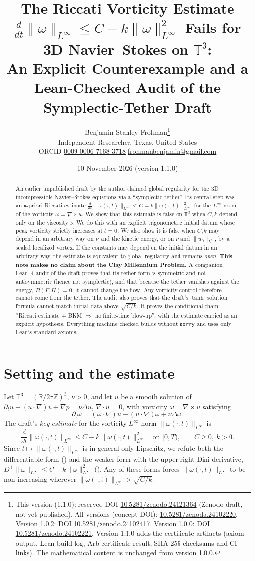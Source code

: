 \documentclass[11pt]{article}
\title{The Riccati Vorticity Estimate $\frac{d}{dt}\|\omega\|_{L^\infty}\le C-k\|\omega\|_{L^\infty}^2$ Fails for 3D Navier--Stokes on $\mathbb{T}^3$:\\
An Explicit Counterexample and a Lean-Checked Audit of the Symplectic-Tether Draft}
\author{Benjamin Stanley Frohman\thanks{This version (1.1.0): reserved DOI \href{https://doi.org/10.5281/zenodo.24121364}{10.5281/zenodo.24121364} (Zenodo draft, not yet published). All versions (concept DOI): \href{https://doi.org/10.5281/zenodo.24102220}{10.5281/zenodo.24102220}. Version 1.0.2: DOI \href{https://doi.org/10.5281/zenodo.24102417}{10.5281/zenodo.24102417}. Version 1.0.0: DOI \href{https://doi.org/10.5281/zenodo.24102221}{10.5281/zenodo.24102221}. Version 1.1.0 adds the certificate artifacts (axiom output, Lean build log, Arb certificate result, SHA-256 checksums and CI links). The mathematical content is unchanged from version 1.0.0.}\\
\small Independent Researcher, Texas, United States\\
\small ORCID \href{https://orcid.org/0009-0006-7068-3718}{0009-0006-7068-3718} \quad
\small \href{mailto:frohmanbenjamin@gmail.com}{frohmanbenjamin@gmail.com}}
\date{10 November 2026 \quad (version 1.1.0)}
\newcommand{\T}{\mathbb{T}^3}
\newcommand{\R}{\mathbb{R}}
\theoremstyle{remark}
\newcommand{\lean}[1]{\path{#1}}
\begin{document}
\maketitle

\begin{abstract}
An earlier unpublished draft by the author claimed global regularity for the 3D incompressible
Navier--Stokes equations via a ``symplectic tether''. Its central step was an a-priori Riccati estimate
$\frac{d}{dt}\|\omega(\cdot,t)\|_{L^\infty}\le C-k\|\omega(\cdot,t)\|_{L^\infty}^2$ for the $L^\infty$ norm of the vorticity $\omega=\nabla\times u$. We show that this estimate is
false on $\T$ when $C,k$ depend only on the viscosity $\nu$. We do this with an explicit trigonometric initial
datum whose peak vorticity strictly increases at $t=0$. We also show it is false when $C,k$ may depend in an
arbitrary way on $\nu$ and the kinetic energy, or on $\nu$ and $\|u_0\|_{L^3}$, by a scaled localized vortex. If the constants may
depend on the initial datum in an arbitrary way, the estimate is equivalent to global regularity and remains
\emph{open}. \textbf{This note makes no claim about the Clay Millennium Problem.} A companion Lean~4 audit of the draft proves that its
tether form is symmetric and not antisymmetric (hence not symplectic), and that because the tether vanishes against the
energy, $B(F,H)=0$, it cannot change the flow. Any vorticity control therefore cannot come from the tether. The audit
also proves that the draft's $\tanh$ solution formula cannot match initial data above $\sqrt{C/k}$. It proves
the conditional chain ``Riccati estimate $+$ BKM $\Rightarrow$ no finite-time blow-up'', with the estimate
carried as an explicit hypothesis. Everything machine-checked builds without \texttt{sorry} and uses only
Lean's standard axioms.
\end{abstract}

\section{Setting and the estimate}
Let $\T=(\R/2\pi\mathbb{Z})^3$, $\nu>0$, and let $u$ be a smooth solution of
$\partial_t u+(u\cdot\nabla)u+\nabla p=\nu\Delta u$, $\nabla\cdot u=0$, with vorticity $\omega=\nabla\times u$ satisfying
\begin{equation}\label{eq:vort}
\partial_t\omega=(\omega\cdot\nabla)u-(u\cdot\nabla)\omega+\nu\Delta\omega .
\end{equation}
The draft's \emph{key estimate} for the vorticity $L^\infty$ norm $\|\omega(\cdot,t)\|_{L^\infty}$ is
\begin{equation}\label{eq:key}
\frac{d}{dt}\|\omega(\cdot,t)\|_{L^\infty}\le C-k\,\|\omega(\cdot,t)\|_{L^\infty}^2\quad\text{on }[0,T),\qquad C\ge0,\ k>0 .
\end{equation}
Since $t\mapsto\|\omega(\cdot,t)\|_{L^\infty}$ is in general only Lipschitz, we refute both the differentiable form (\lean{DraftRiccatiEstimate})
and the weaker form with the upper right Dini derivative, $D^+\|\omega\|_{L^\infty}\le C-k\|\omega\|_{L^\infty}^2$ (\lean{DiniRiccatiEstimate}). Any
of these forms forces $\|\omega(\cdot,t)\|_{L^\infty}$ to be non-increasing wherever $\|\omega(\cdot,t)\|_{L^\infty}>\sqrt{C/k}$.
\end{document}
